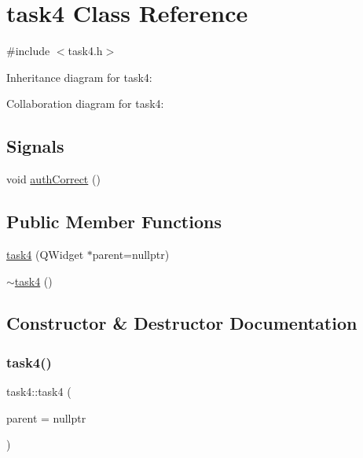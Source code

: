 \hypertarget{classtask4}{}\section{task4 Class Reference}
\label{classtask4}


{\ttfamily \#include $<$task4.\+h$>$}



Inheritance diagram for task4\+:


Collaboration diagram for task4\+:
\subsection*{Signals}
\begin{DoxyCompactItemize}
\item 
void \mbox{\hyperlink{classtask4_a8806f02eef52c03512e8c49cc64b1833}{auth\+Correct}} ()
\end{DoxyCompactItemize}
\subsection*{Public Member Functions}
\begin{DoxyCompactItemize}
\item 
\mbox{\hyperlink{classtask4_a7c79fd61c256ac8fb509e2b7a1d700a5}{task4}} (Q\+Widget $\ast$parent=nullptr)
\item 
\mbox{\hyperlink{classtask4_a452c5308f6ca5087584c8078af5504d8}{$\sim$task4}} ()
\end{DoxyCompactItemize}


\subsection{Constructor \& Destructor Documentation}
\mbox{\label{classtask4_a7c79fd61c256ac8fb509e2b7a1d700a5}} 
\subsubsection{\texorpdfstring{task4()}{task4()}}
{\footnotesize\ttfamily task4\+::task4 (\begin{DoxyParamCaption}\item[{Q\+Widget $\ast$}]{parent = {\ttfamily nullptr} }\end{DoxyParamCaption})\hspace{0.3cm}{\ttfamily [explicit]}}

